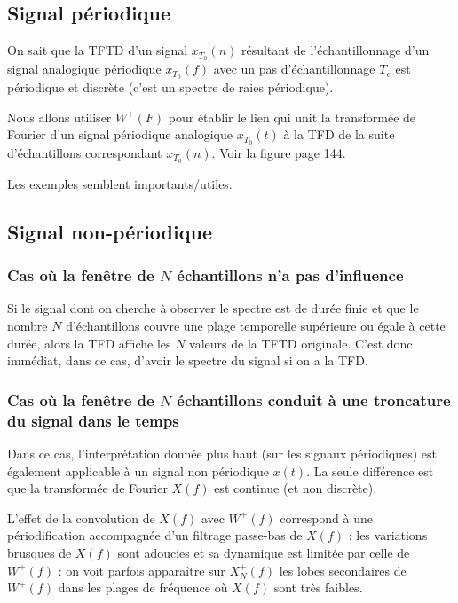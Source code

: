         \subsection{Signal périodique}
            On sait que la TFTD d'un signal $x_{T_0}(n)$ résultant de l'échantillonnage d'un signal analogique périodique $x_{T_0}(f)$ avec un pas d'échantillonnage $T_e$ est périodique et discrète (c'est un spectre de raies périodique).

            Nous allons utiliser $W^+(F)$ pour établir le lien qui unit la transformée de Fourier d'un signal périodique analogique $x_{T_0}(t)$ à la TFD de la suite d'échantillons correspondant $x_{T_0}(n)$. Voir la figure page 144.

            \begin{exemple}
                Les exemples semblent importants/utiles.
            \end{exemple}

        \subsection{Signal non-périodique}
            \subsubsection{Cas où la fenêtre de $N$ échantillons n'a pas d'influence}
                Si le signal dont on cherche à observer le spectre est de durée finie et que le nombre $N$ d'échantillons couvre une plage temporelle supérieure ou égale à cette durée, alors la TFD affiche les $N$ valeurs de la TFTD originale. C'est donc immédiat, dans ce cas, d'avoir le spectre du signal si on a la TFD.

            \subsubsection{Cas où la fenêtre de $N$ échantillons conduit à une troncature du signal dans le temps}
                Dans ce cas, l'interprétation donnée plus haut (sur les signaux périodiques) est également applicable à un signal non périodique $x(t)$. La seule différence est que la transformée de Fourier $X(f)$ est continue (et non discrète).

                L'effet de la convolution de $X(f)$ avec $W^+(f)$ correspond à une périodification accompagnée d'un filtrage passe-bas de $X(f)$ : les variations brusques de $X(f)$ sont adoucies et sa dynamique est limitée par celle de $W^+(f)$ : on voit parfois apparaître sur $X_N^+(f)$ les lobes secondaires de $W^+(f)$ dans les plages de fréquence où $X(f)$ sont très faibles.

